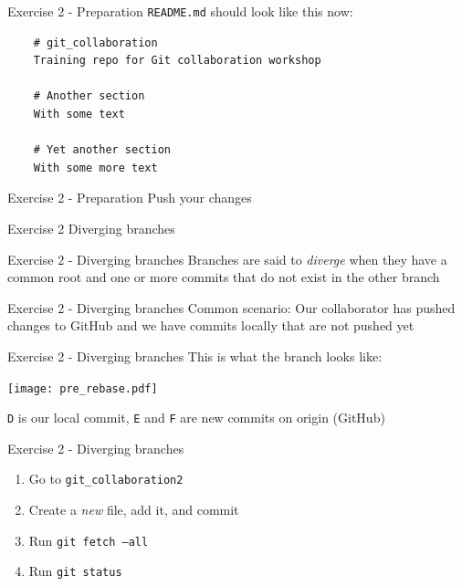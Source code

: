 \documentclass{beamer}
\newcommand{\fmtcmd}[1]{\texttt{#1}}
\begin{document}
\begin{frame}[fragile]{Exercise 2 - Preparation}
  \fmtcmd{README.md} should look like this now:

  \begin{verbatim}
    # git_collaboration
    Training repo for Git collaboration workshop

    # Another section
    With some text

    # Yet another section
    With some more text
  \end{verbatim}
\end{frame}

\begin{frame}{Exercise 2 - Preparation}
  \center
  \huge Push your changes
\end{frame}

\begin{frame}{Exercise 2}
  \center
  \Huge Diverging branches
\end{frame}

\begin{frame}{Exercise 2 - Diverging branches}
  \center
  \Large Branches are said to \emph{diverge} when they have a common
  root and one or more commits that do not exist in the other branch
\end{frame}

\begin{frame}{Exercise 2 - Diverging branches}
  \center
  \Large Common scenario: Our collaborator has pushed changes to
  GitHub and we have commits locally that are not pushed yet
\end{frame}

\begin{frame}{Exercise 2 - Diverging branches}
  \center
  \huge This is what the branch looks like:

  \vspace{0.3cm}
  \texttt{[image: pre\_rebase.pdf]}
  \pause

  \LARGE \fmtcmd{D} is our local commit, \fmtcmd{E} and \fmtcmd{F} are
  new commits on origin (GitHub)
\end{frame}

\begin{frame}{Exercise 2 - Diverging branches}
  \begin{enumerate}
    \item Go to \fmtcmd{git_collaboration2}
    \item Create a \emph{new} file, add it, and commit
    \item Run \fmtcmd{git fetch --all}
    \item Run \fmtcmd{git status}
  \end{enumerate}
\end{frame}
\end{document}
